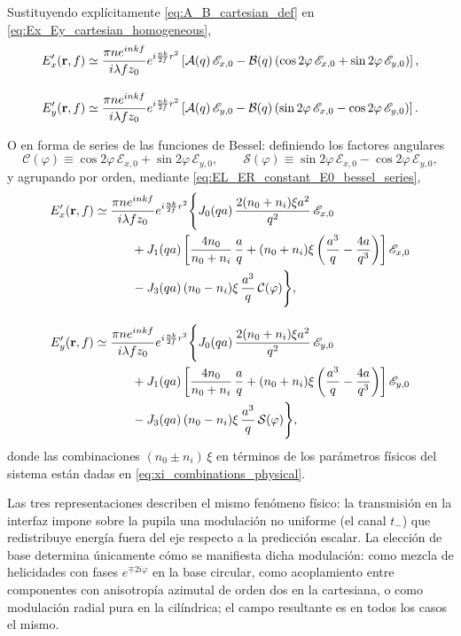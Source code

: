 Sustituyendo explícitamente \eqref{eq:A_B_cartesian_def} en \eqref{eq:Ex_Ey_cartesian_homogeneous},
\begin{equation}
\begin{aligned}
E'_x(\vb r,f)
&\simeq
\frac{\pi n e^{inkf}}{i\lambda f z_0}
e^{i\frac{nk}{2f}r^2}
\left[
\mathcal A(q)\,\mathscr E_{x,0}
-
\mathcal B(q)
\left(
\cos2\varphi\,\mathscr E_{x,0}
+
\sin2\varphi\,\mathscr E_{y,0}
\right)
\right],
\\[1em]
E'_y(\vb r,f)
&\simeq
\frac{\pi n e^{inkf}}{i\lambda f z_0}
e^{i\frac{nk}{2f}r^2}
\left[
\mathcal A(q)\,\mathscr E_{y,0}
-
\mathcal B(q)
\left(
\sin2\varphi\,\mathscr E_{x,0}
-
\cos2\varphi\,\mathscr E_{y,0}
\right)
\right].
\end{aligned}
\label{eq:Ex_Ey_cartesian_homogeneous_AB}
\end{equation}

O en forma de series de las funciones de Bessel: definiendo los factores angulares
\begin{equation}
\mathcal C(\varphi)
\equiv
\cos2\varphi\,\mathscr E_{x,0}+\sin2\varphi\,\mathscr E_{y,0},
\qquad
\mathcal S(\varphi)
\equiv
\sin2\varphi\,\mathscr E_{x,0}-\cos2\varphi\,\mathscr E_{y,0},
\label{eq:cartesian_angular_factors}
\end{equation}
y agrupando por orden, mediante \eqref{eq:EL_ER_constant_E0_bessel_series},
\begin{equation}
\begin{aligned}
E'_x(\vb r,f)
\simeq&\;
\frac{\pi n e^{inkf}}{i\lambda f z_0}
e^{i\frac{nk}{2f}r^2}
\Bigg\{
J_0(qa)\,
\frac{2(n_0+n_i)\xi a^2}{q^2}\,
\mathscr E_{x,0}
\\
&\qquad
+
J_1(qa)
\left[
\frac{4n_0}{n_0+n_i}\,\frac{a}{q}
+
(n_0+n_i)\xi
\left(
\frac{a^3}{q}
-
\frac{4a}{q^3}
\right)
\right]
\mathscr E_{x,0}
\\
&\qquad
-
J_3(qa)\,
(n_0-n_i)\xi\,\frac{a^3}{q}\,
\mathcal C(\varphi)
\Bigg\},
\\[1em]
E'_y(\vb r,f)
\simeq&\;
\frac{\pi n e^{inkf}}{i\lambda f z_0}
e^{i\frac{nk}{2f}r^2}
\Bigg\{
J_0(qa)\,
\frac{2(n_0+n_i)\xi a^2}{q^2}\,
\mathscr E_{y,0}
\\
&\qquad
+
J_1(qa)
\left[
\frac{4n_0}{n_0+n_i}\,\frac{a}{q}
+
(n_0+n_i)\xi
\left(
\frac{a^3}{q}
-
\frac{4a}{q^3}
\right)
\right]
\mathscr E_{y,0}
\\
&\qquad
-
J_3(qa)\,
(n_0-n_i)\xi\,\frac{a^3}{q}\,
\mathcal S(\varphi)
\Bigg\},
\end{aligned}
\label{eq:Ex_Ey_cartesian_bessel_series}
\end{equation}
donde las combinaciones $(n_0\pm n_i)\,\xi$ en términos de los parámetros
físicos del sistema están dadas en \eqref{eq:xi_combinations_physical}.

Las tres representaciones describen el mismo fenómeno físico: la transmisión
en la interfaz impone sobre la pupila una modulación no uniforme (el canal
$t_-$) que redistribuye energía fuera del eje respecto a la predicción
escalar. La elección de base determina únicamente cómo se manifiesta dicha
modulación: como mezcla de helicidades con fases $e^{\mp2i\varphi}$ en la
base circular, como acoplamiento entre componentes con anisotropía azimutal
de orden dos en la cartesiana, o como modulación radial pura en la
cilíndrica; el campo resultante es en todos los casos el mismo.
